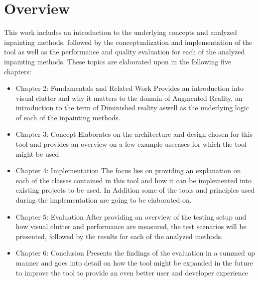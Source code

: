\section{Overview}

This work includes an introduction to the underlying concepts and analyzed inpainting methods, followed by the conceptualization and implementation of the tool as well as the performance and quality evaluation for each of the analyzed inpainting methods. These topics are elaborated upon in the following five chapters:

\begin{itemize}
\item Chapter 2: Fundamentals and Related Work
Provides an introduction into visual clutter and why it matters to the domain of Augmented Reality, an introduction to the term of Diminished reality aswell as the underlying logic of each of the inpainting methods. 

\item Chapter 3: Concept
Elaborates on the architecture and design chosen for this tool and provides an overview on a few example usecases for which the tool might be used

\item Chapter 4: Implementation
The focus lies on providing an explanation on each of the classes contained in this tool and how it can be implemented into existing projects to be used. In Addition some of the tools and principles used during the implementation are going to be elaborated on.

\item Chapter 5: Evaluation
After providing an overview of the testing setup and how visual clutter and performance are measured, the test scenarios will be presented, followed by the results for each of the analyzed methods.

\item Chapter 6: Conclusion
Presents the findings of the evaluation in a summed up manner and goes into detail on how the tool might be expanded in the future to improve the tool to provide an even better user and developer experience
\end{itemize}